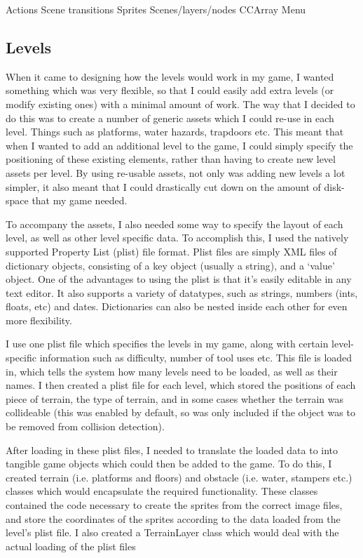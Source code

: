 \documentclass[a4paper,oneside]{report}
\begin{document}
Actions
Scene transitions
Sprites
Scenes/layers/nodes
CCArray
Menu

\subsection{Levels} 

When it came to designing how the levels would work in my game, I wanted something which was very flexible, so that I could easily add extra levels (or modify existing ones) with a minimal amount of work. The way that I decided to do this was to create a number of generic assets which I could re-use in each level. Things such as platforms, water hazards, trapdoors etc. This meant that when I wanted to add an additional level to the game, I could simply specify the positioning of these existing elements, rather than having to create new level assets per level. By using re-usable assets, not only was adding new levels a lot simpler, it also meant that I could drastically cut down on the amount of disk-space that my game needed.

To accompany the assets, I also needed some way to specify the layout of each level, as well as other level specific data. To accomplish this, I used the natively supported Property List (plist) file format. Plist files are simply XML files of dictionary objects, consisting of a key object (usually a string), and a `value' object. One of the advantages to using the plist is that it's easily editable in any text editor. It also supports a variety of datatypes, such as strings, numbers (ints, floats, etc) and dates. Dictionaries can also be nested inside each other for even more flexibility. 

I use one plist file which specifies the levels in my game, along with certain level-specific information such as difficulty, number of tool uses etc. This file is loaded in, which tells the system how many levels need to be loaded, as well as their names. I then created a plist file for each level, which stored the positions of each piece of terrain, the type of terrain, and in some cases whether the terrain was collideable (this was enabled by default, so was only included if the object was to be removed from collision detection).

After loading in these plist files, I needed to translate the loaded data to into tangible game objects which could then be added to the game. To do this, I created terrain (i.e. platforms and floors) and obstacle (i.e. water, stampers etc.) classes which would encapsulate the required functionality. These classes contained the code necessary to create the sprites from the correct image files, and store the coordinates of the sprites according to the data loaded from the level's plist file. I also created a TerrainLayer class which would deal with the actual loading of the plist files
\end{document}
